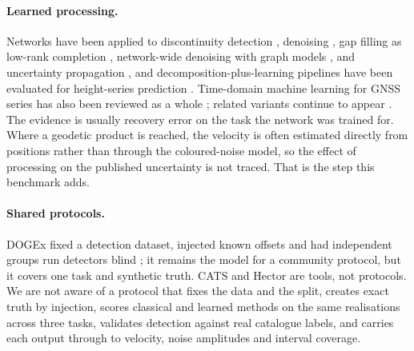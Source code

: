 \paragraph{Learned processing.}
Networks have been applied to discontinuity detection
\citep{crocetti2021discontinuity,wang2025changepointcnn}, denoising
\citep{li2018denoising,mastella2025denoising,gao2022gbdt,he2026tspredictor},
gap filling as low-rank completion \citep{liu2022imputation}, network-wide
denoising with graph models \citep{bachelot2025gnn}, and uncertainty propagation
\citep{kiani2022uncertainty}, and decomposition-plus-learning pipelines have been
evaluated for height-series prediction \citep{guo2026decomposition}. Time-domain
machine learning for GNSS series has also been reviewed as a whole
\citep{gabsatarov2025review}; related variants continue to appear
\citep{simsek2025dl,ozarpaci2024machine}. The evidence is usually recovery error
on the task the network was trained for. Where a geodetic product is reached, the
velocity is often estimated directly from positions rather than through the
coloured-noise model, so the effect of processing on the published uncertainty is
not traced. That is the step this benchmark adds.

\paragraph{Shared protocols.}
DOGEx fixed a detection dataset, injected known offsets and had independent
groups run detectors blind \citep{gazeaux2013detecting}; it remains the model for
a community protocol, but it covers one task and synthetic truth. CATS and Hector
are tools, not protocols. We are not aware of a protocol that fixes the data and
the split, creates exact truth by injection, scores classical and learned methods
on the same realisations across three tasks, validates detection against real
catalogue labels, and carries each output through to velocity, noise amplitudes
and interval coverage.

